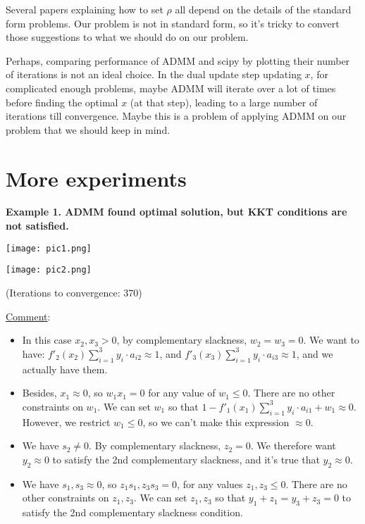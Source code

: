 \documentclass{article}
\begin{document}
Several papers explaining how to set $\rho$ all depend on the details of the standard form problems. Our problem is not in standard form, so it's tricky to convert those suggestions to what we should do on our problem.  

Perhaps, comparing performance of ADMM and scipy by plotting their number of iterations is not an ideal choice. In the dual update step updating $x$, for complicated enough problems, maybe ADMM will iterate over a lot of times before finding the optimal $x$ (at that step), leading to a large number of iterations till convergence. Maybe this is a problem of applying ADMM on our problem that we should keep in mind.

\section{More experiments}


\textbf{Example 1. ADMM found optimal solution, but KKT conditions are not satisfied.}

\texttt{[image: pic1.png]}

\texttt{[image: pic2.png]}

(Iterations to convergence: 370)

\underline{Comment}: 
\begin{itemize}
\item In this case $x_2, x_3 > 0$, by complementary slackness, $w_2=w_3=0$. We want to have: $f'_2(x_2) \sum\limits_{i=1}^3 y_i \cdot a_{i2} \approx 1$, and $f'_3(x_3) \sum\limits_{i=1}^3 y_i \cdot a_{i3} \approx 1$, and we actually have them. \\
\item Besides, $x_1 \approx 0$, so $w_1 x_1 = 0$ for any value of $w_1 \le 0$. There are no other constraints on $w_1$. We can set $w_1$ so that $1 - f'_1(x_1) \sum\limits_{i=1}^3 y_i \cdot a_{i1} + w_1 \approx 0$. 
\\However, we restrict $w_1 \le 0$, so we can't make this expression $\approx 0$. 
\item \color{black} We have $s_2 \neq 0$. By complementary slackness, $z_2 = 0$. We therefore want $y_2 \approx 0$ to satisfy the 2nd complementary slackness, and it's true that $y_2 \approx 0$.
\item We have $s_1,s_3 \approx 0$, so $z_1s_1, z_3 s_3 = 0$, for any values $z_1,z_3 \le 0$. There are no other constraints on $z_1,z_3$. We can set $z_1,z_3$ so that $y_1 + z_1 = y_3 + z_3 = 0$ to satisfy the 2nd complementary slackness condition.
\end{itemize}
\end{document}
